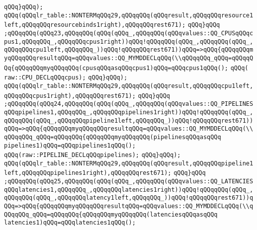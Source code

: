 \verb|qQQq}qQQq);|\newline
\verb|qQQq(qQQqlr_table::NONTERMqQQq29,qQQqqQQq(qQQqresult,qQQqqQQqresource1left,qQQqqQQqresourcebinds1right),qQQqqQQqrest671);|\newline
\verb|qQQq}qQQq|\newline
\verb|;qQQqqQQq(qQQq23,qQQqqQQq(qQQq(qQQq_,qQQqqQQq(qQQqvalues::QQ_CPUSqQQqcpus1,qQQqqQQq_,qQQqqQQqcpus1right))qQQq!qQQqqQQq(qQQq_,qQQqqQQq(qQQq_,qQQqqQQqcpu1left,qQQqqQQq_))qQQq!qQQqqQQqrest671))qQQq=>qQQq{qQQqqQQqmyqQQqqQQqresultqQQq=qQQqvalues::QQ_MYMDDECLqQQq(\\qQQqqQQq_qQQq=qQQqqQQq{qQQqqQQqmyqQQqqQQq(cpusqQQqasqQQqcpus1)qQQq=qQQqcpus1qQQq();|\newline
\verb|qQQq(|\newline
\verb|raw::CPU_DECLqQQqcpus);|\newline
\verb|qQQq}qQQq);|\newline
\verb|qQQq(qQQqlr_table::NONTERMqQQq29,qQQqqQQq(qQQqresult,qQQqqQQqcpu1left,qQQqqQQqcpus1right),qQQqqQQqrest671);|\newline
\verb|qQQq}qQQq|\newline
\verb|;qQQqqQQq(qQQq24,qQQqqQQq(qQQq(qQQq_,qQQqqQQq(qQQqvalues::QQ_PIPELINESqQQqpipelines1,qQQqqQQq_,qQQqqQQqpipelines1right))qQQq!qQQqqQQq(qQQq_,qQQqqQQq(qQQq_,qQQqqQQqpipeline1left,qQQqqQQq_))qQQq!qQQqqQQqrest671))qQQq=>qQQq{qQQqqQQqmyqQQqqQQqresultqQQq=qQQqvalues::QQ_MYMDDECLqQQq(\\qQQqqQQq_qQQq=qQQqqQQq{qQQqqQQqmyqQQqqQQq(pipelinesqQQqasqQQq|\newline
\verb|pipelines1)qQQq=qQQqpipelines1qQQq();|\newline
\verb|qQQq(raw::PIPELINE_DECLqQQqpipelines);|\newline
\verb|qQQq}qQQq);|\newline
\verb|qQQq(qQQqlr_table::NONTERMqQQq29,qQQqqQQq(qQQqresult,qQQqqQQqpipeline1left,qQQqqQQqpipelines1right),qQQqqQQqrest671);|\newline
\verb|qQQq}qQQq|\newline
\verb|;qQQqqQQq(qQQq25,qQQqqQQq(qQQq(qQQq_,qQQqqQQq(qQQqvalues::QQ_LATENCIESqQQqlatencies1,qQQqqQQq_,qQQqqQQqlatencies1right))qQQq!qQQqqQQq(qQQq_,qQQqqQQq(qQQq_,qQQqqQQqlatency1left,qQQqqQQq_))qQQq!qQQqqQQqrest671))qQQq=>qQQq{qQQqqQQqmyqQQqqQQqresultqQQq=qQQqvalues::QQ_MYMDDECLqQQq(\\qQQqqQQq_qQQq=qQQqqQQq{qQQqqQQqmyqQQqqQQq(latenciesqQQqasqQQq|\newline
\verb|latencies1)qQQq=qQQqlatencies1qQQq();|\newline
